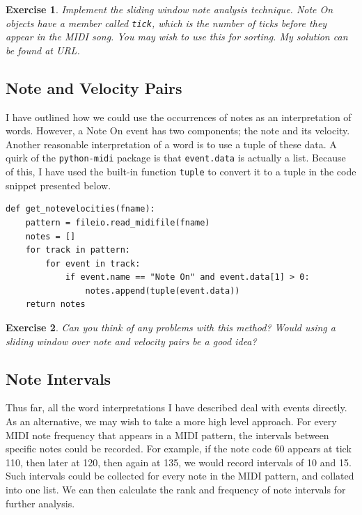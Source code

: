 \documentclass[10pt]{book}
\newtheorem{exercise}{Exercise}[chapter]
\begin{document}
\begin{exercise}
Implement the sliding window note analysis technique. Note On objects have a member called \texttt{tick}, which is the number of ticks before they appear in the MIDI song. You may wish to use this for sorting. My solution can be found at URL.
\end{exercise}


\subsection{Note and Velocity Pairs}
I have outlined how we could use the occurrences of notes as an interpretation of words. However, a Note On event has two components; the note and its velocity. Another reasonable interpretation of a word is to use a tuple of these data. A quirk of the \texttt{python-midi} package is that \texttt{event.data} is actually a list. Because of this, I have used the built-in function \texttt{tuple} to convert it to a tuple in the code snippet presented below.

\begin{verbatim}
def get_notevelocities(fname):
    pattern = fileio.read_midifile(fname)
    notes = []
    for track in pattern:
        for event in track:
            if event.name == "Note On" and event.data[1] > 0:
                notes.append(tuple(event.data))
    return notes
\end{verbatim}


\begin{exercise}
Can you think of any problems with this method? Would using a sliding window over note and velocity pairs be a good idea?
\end{exercise}



\subsection{Note Intervals}
Thus far, all the word interpretations I have described deal with events directly. As an alternative, we may wish to take a more high level approach. For every MIDI note frequency that appears in a MIDI pattern, the intervals between specific notes could be recorded. For example, if the note code 60 appears at tick 110, then later at 120, then again at 135, we would record intervals of 10 and 15. Such intervals could be collected for every note in the MIDI pattern, and collated into one list. We can then calculate the rank and frequency of note intervals for further analysis.
\end{document}
